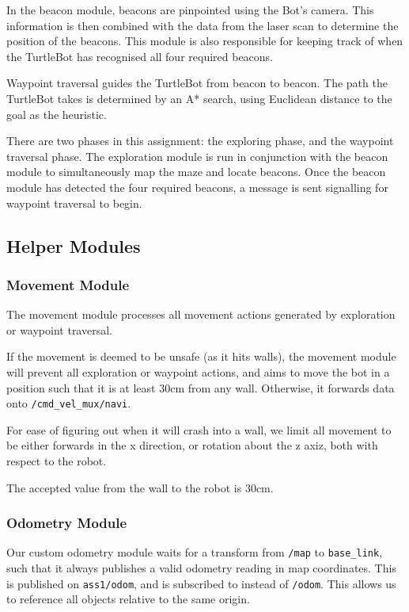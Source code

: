 \documentclass[titlepage,12pt,a4paper]{article}
\begin{document}
In the beacon module, beacons are pinpointed using the Bot's camera. This information is then combined with the data from the laser scan to determine the position of the beacons. This module is also responsible for keeping track of when the TurtleBot has recognised all four required beacons. 

Waypoint traversal guides the TurtleBot from beacon to beacon. The path the TurtleBot takes is determined by an A* search, using Euclidean distance to the goal as the heuristic. 

There are two phases in this assignment: the exploring phase, and the waypoint traversal phase. The exploration module is run in conjunction with the beacon module to simultaneously map the maze and locate beacons. Once the beacon module has detected the four required beacons, a message is sent signalling for waypoint traversal to begin. 

\subsection{Helper Modules}
\subsubsection{Movement Module}
The movement module processes all movement actions generated by exploration or waypoint traversal. 

If the movement is deemed to be unsafe (as it hits walls), the movement module will prevent all exploration or waypoint actions, and aims to move the bot in a position such that it is at least 30cm from any wall. Otherwise, it forwards data onto \verb|/cmd_vel_mux/navi|. 

For ease of figuring out when it will crash into a wall, we limit all movement to be either forwards in the x direction, or rotation about the z axiz, both with respect to the robot.

The accepted value from the wall to the robot is 30cm.

\subsubsection{Odometry Module}
Our custom odometry module waits for a transform from \verb|/map| to \verb|base_link|, such that it always publishes a valid odometry reading in map coordinates. This is published on \verb|ass1/odom|, and is subscribed to instead of \verb|/odom|. This allows us to reference all objects relative to the same origin.
\end{document}
